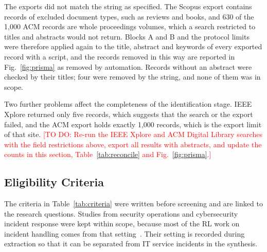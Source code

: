 \documentclass[journal]{IEEEtran}
\newcommand{\todo}[1]{\textcolor{red}{[TO DO: #1]}}
\begin{document}
The exports did not match the string as specified. The Scopus export contains records of excluded document types, such as reviews and books, and 630 of the 1,000 ACM records are whole proceedings volumes, which a search restricted to titles and abstracts would not return. Blocks A and B and the protocol limits were therefore applied again to the title, abstract and keywords of every exported record with a script, and the records removed in this way are reported in Fig.~\ref{fig:prisma} as removed by automation. Records without an abstract were checked by their titles; four were removed by the string, and none of them was in scope.

Two further problems affect the completeness of the identification stage. IEEE Xplore returned only five records, which suggests that the search or the export failed, and the ACM export holds exactly 1,000 records, which is the export limit of that site. \todo{Re-run the IEEE Xplore and ACM Digital Library searches with the field restrictions above, export all results with abstracts, and update the counts in this section, Table~\ref{tab:reconcile} and Fig.~\ref{fig:prisma}.}

\subsection{Eligibility Criteria}

The criteria in Table~\ref{tab:criteria} were written before screening and are linked to the research questions. Studies from security operations and cybersecurity incident response were kept within scope, because most of the RL work on incident handling comes from that setting~\cite{ren2025,dunsin2025,hammar2025,alauthman2026}. Their setting is recorded during extraction so that it can be separated from IT service incidents in the synthesis.
\end{document}
